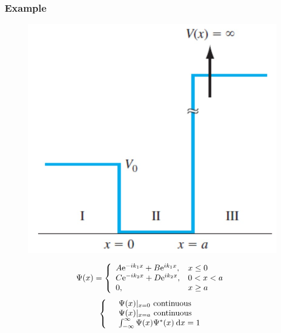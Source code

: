 \documentclass{beamer}
\begin{document}
    \begin{frame} \frametitle{Example}
        \begin{figure}[H]
            \centering
            \includegraphics[width=0.4\linewidth]{Example-quantum-well.jpg}
            \label{fig:Example-quantum-well-2.jpg}
        \end{figure}
        \begin{equation*}
            \Psi(x) = \left\{
                \begin{array}{ll}
                    A \mathrm{e}^{-ik_1x} + B\mathrm{e}^{ik_1x} , & x \le 0\\
                    C \mathrm{e}^{-ik_2x} + D \mathrm{e}^{ik_2x}, & 0 < x < a \\
                    0, & x \ge a 
                \end{array}
            \right.
        \end{equation*}
        \begin{equation*}
            \left\{
                \begin{array}{ll}
                    & \Psi (x) | _{x = 0} \text{ continuous}\\
                    & \Psi (x) | _{x = a} \text{ continuous}\\
                    & \int_{-\infty}^{\infty} \Psi(x) \Psi^*(x) \: \mathrm{d} x = 1 \\
                \end{array}
            \right.
        \end{equation*}
    \end{frame}

\end{document}
